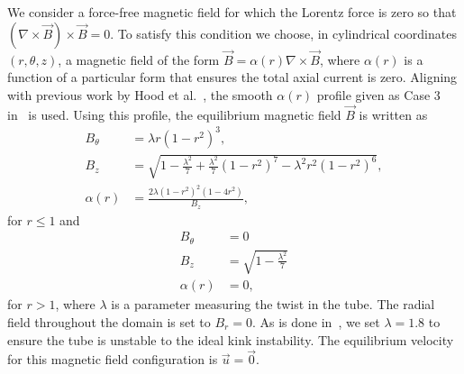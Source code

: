 We consider a force-free magnetic field for which the Lorentz
  force is zero so that $(\nabla \times
  \vec{B})\times \vec{B} = 0$.
To satisfy this condition we choose, in cylindrical coordinates
  $(r,\theta,z)$, a magnetic field of the form $\vec{B} = \alpha(r) \nabla \times \vec{B}$, where
$\alpha(r)$ is a function of a particular form that ensures the total
axial current is zero. Aligning with previous work by Hood et
al.~\cite{hoodCoronalHeatingMagnetic2009}, the smooth $\alpha(r)$
profile given as Case 3 in~\cite{hoodCoronalHeatingMagnetic2009} is
used. Using this profile, the equilibrium magnetic field $\vec{B}$ is
written  as
\begin{equation}
\begin{aligned}
  \label{eq:field-profile-r-lt-1}
  B_{\theta} &= \lambda r {(1 - r^2)}^3,\\
  B_z &= \sqrt{1 - \frac{\lambda^2}{7} + \frac{\lambda^2}{7}{(1 - r^2)}^7 - \lambda^2 r^2 {(1-r^2)}^6},\\
  \alpha(r) &= \frac{2 \lambda {(1-r^2)}^2 {(1-4r^2)}}{B_z},
\end{aligned}
\end{equation}
for $r \leq 1$ and
\begin{equation}
\begin{aligned}
  \label{eq:field-profile-r-gt-1}
  B_{\theta} &= 0 \\
  B_z &= \sqrt{1 - \frac{\lambda^2}{7}}\\
  \alpha(r) &= 0 ,
\end{aligned}
\end{equation}
for $r > 1$, where $\lambda$ is a parameter measuring the twist in the tube. The radial field throughout the domain is set to $B_r = 0$. As is done in~\cite{hoodCoronalHeatingMagnetic2009}, we set $\lambda = 1.8$ to ensure the tube is unstable to the ideal kink instability. The equilibrium velocity for this magnetic field configuration is $\vec{u} = \vec{0}$.

